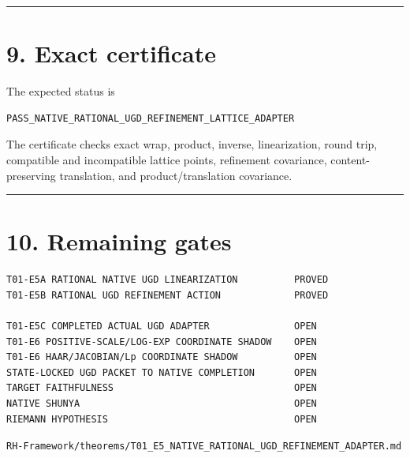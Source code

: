 \begin{center}\rule{0.5\linewidth}{0.5pt}\end{center}

\hypertarget{exact-certificate}{%
\section{9. Exact certificate}\label{exact-certificate}}

The expected status is

\begin{verbatim}
PASS_NATIVE_RATIONAL_UGD_REFINEMENT_LATTICE_ADAPTER
\end{verbatim}

The certificate checks exact wrap, product, inverse, linearization, round trip,
compatible and incompatible lattice points, refinement covariance,
content-preserving translation, and product/translation covariance.

\begin{center}\rule{0.5\linewidth}{0.5pt}\end{center}

\hypertarget{remaining-gates}{%
\section{10. Remaining gates}\label{remaining-gates}}

\begin{verbatim}
T01-E5A RATIONAL NATIVE UGD LINEARIZATION          PROVED
T01-E5B RATIONAL UGD REFINEMENT ACTION             PROVED

T01-E5C COMPLETED ACTUAL UGD ADAPTER               OPEN
T01-E6 POSITIVE-SCALE/LOG-EXP COORDINATE SHADOW    OPEN
T01-E6 HAAR/JACOBIAN/Lp COORDINATE SHADOW          OPEN
STATE-LOCKED UGD PACKET TO NATIVE COMPLETION       OPEN
TARGET FAITHFULNESS                                OPEN
NATIVE SHUNYA                                      OPEN
RIEMANN HYPOTHESIS                                 OPEN
\end{verbatim}

\begin{flushright}\small\texttt{RH-Framework/theorems/T01\_E5\_NATIVE\_RATIONAL\_UGD\_REFINEMENT\_ADAPTER.md}\end{flushright}
